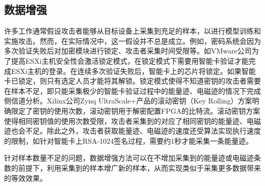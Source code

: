 {	\subsection{数据增强}
	
	许多工作通常假设攻击者能够从目标设备上采集到充足的样本，以进行模型训练和实施攻击。然而，在实际情况中，这一假设并不总是成立。例如，密码系统会因为多次验证失败后对加密模块进行锁定、攻击者采集时间受限等。如VMware公司为了提高ESXi主机安全性会激活锁定模式，在锁定模式下需要用智能卡验证才能完成ESXi主机的登录。在连续多次验证失败后，智能卡上的芯片将锁定。如果智能卡已锁定，则只有选定人员才能将其解锁\citep{GUID-04636353-4A11-4874-9D59-7F4F4E5CF1F}。锁定模式使得不知道密钥的攻击者需要在样本不足，即只能采集极少的智能卡验证过程中的能量迹、电磁迹的情况下完成侧信道分析。Xilinx公司Zynq UltraScale+产品的滚动密钥（Key Rolling）方案明确限定了密钥的使用次数\citep{UG1085}，滚动密钥用于解密配置FPGA的比特流。滚动密钥方案使得相同密钥值的使用次数受限，攻击者采集到的对应了相同密钥的能量迹、电磁迹也会不足。除此之外，攻击者获取能量迹、电磁迹的速度还受算法实现执行速度的限制，如针对智能卡上RSA-1024签名过程，需要约1秒才能采集一条能量迹。
	
	针对样本数量不足的问题，数据增强方法可以在不增加采集到的能量迹或电磁迹条数的前提下，利用采集到的样本增广新的样本，从而实现类似于采集更多数据带来的等效效果。
	
}
